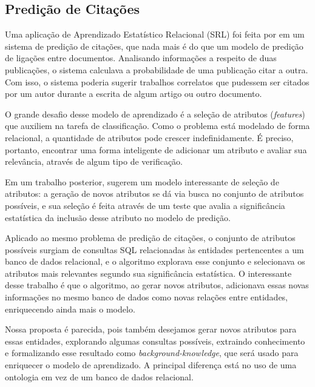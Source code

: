 \subsection{Predição de Citações}
\label{ssec:srl}

Uma aplicação de Aprendizado Estatístico Relacional (SRL) foi feita por \citet{Popescul2003} em um sistema de predição de citações, que nada mais é do que um modelo de predição de ligações entre documentos. Analisando informações a respeito de duas publicações, o sistema calculava a probabilidade de uma publicação citar a outra. Com isso, o sistema poderia sugerir trabalhos correlatos que pudessem ser citados por um autor durante a escrita de algum artigo ou outro documento.

O grande desafio desse modelo de aprendizado é a seleção de atributos (\textit{features}) que auxiliem na tarefa de classificação. Como o problema está modelado de forma relacional, a quantidade de atributos pode crescer indefinidamente. É preciso, portanto, encontrar uma forma inteligente de adicionar um atributo e avaliar sua relevância, através de algum tipo de verificação.

Em um trabalho posterior, \citet{Popescul2007} sugerem um modelo interessante de seleção de atributos: a geração de novos atributos se dá via busca no conjunto de atributos possíveis, e sua seleção é feita através de um teste que avalia a significância estatística da inclusão desse atributo no modelo de predição.

Aplicado ao mesmo problema de predição de citações, o conjunto de atributos possíveis surgiam de consultas SQL relacionadas às entidades pertencentes a um banco de dados relacional, e o algoritmo explorava esse conjunto e selecionava os atributos mais relevantes segundo sua significância estatística. O interessante desse trabalho é que o algoritmo, ao gerar novos atributos, adicionava essas novas informações no mesmo banco de dados como novas relações entre entidades, enriquecendo ainda mais o modelo.

Nossa proposta é parecida, pois também desejamos gerar novos atributos para essas entidades, explorando algumas consultas possíveis, extraindo conhecimento e formalizando esse resultado como \textit{background-knowledge}, que será usado para enriquecer o modelo de aprendizado.  A principal diferença está no uso de uma ontologia em vez de um banco de dados relacional.


